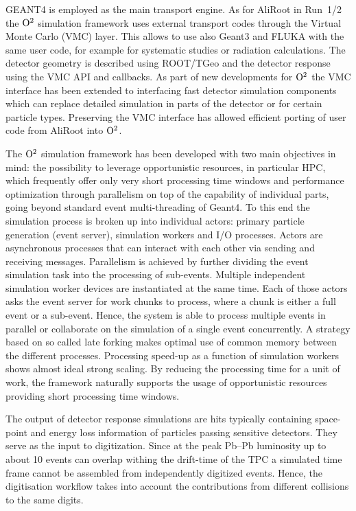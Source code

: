 GEANT4 is employed as the main transport engine. As for AliRoot in Run~1/2 the ${\rm O}^2$ simulation
framework uses external transport codes through the Virtual Monte Carlo (VMC) layer. This
allows to use also Geant3 and FLUKA with the same user code, for example for systematic
studies or radiation calculations. The detector geometry is described using ROOT/TGeo and
the detector response using the VMC API and callbacks. As part of new developments for ${\rm O}^2$
the VMC interface has been extended to interfacing fast detector
simulation components which can replace detailed simulation in parts of the detector or
for certain particle types. Preserving the VMC interface has allowed efficient porting of user code from AliRoot into ${\rm O}^2$.

The ${\rm O}^2$ simulation framework has been developed with two main objectives
in mind: the possibility to leverage opportunistic resources, in
particular HPC, which frequently offer only very short processing time
windows and performance optimization through parallelism on top of the capability of individual parts, going beyond standard event multi-threading of Geant4.
To this end the simulation process is broken up into individual actors:
primary particle generation (event server), simulation workers and I/O
processes. Actors are asynchronous processes that can interact with each
other via sending and receiving messages. Parallelism is achieved by
further dividing the event simulation task into the processing of
sub-events. Multiple independent simulation worker devices are
instantiated at the same time. Each of those actors asks the event
server for work chunks to process, where a chunk is either a full event
or a sub-event. Hence, the system is able to process multiple events in
parallel or collaborate on the simulation of a single event
concurrently. A strategy based on so called late forking makes optimal use of common memory between the different processes. Processing speed-up as a function of simulation workers shows almost ideal strong
scaling. By reducing the processing time for a unit of work, the framework naturally supports the usage of opportunistic resources providing short processing time windows.

The output of detector response simulations are hits typically containing space-point
and energy loss information of particles passing sensitive detectors. They serve as the
input to digitization. Since at the peak Pb--Pb luminosity up to about 10 events can
overlap withing the drift-time of the TPC a simulated time frame cannot be assembled
from independently digitized events. Hence, the digitisation workflow takes into
account the contributions from different collisions to the same digits.

